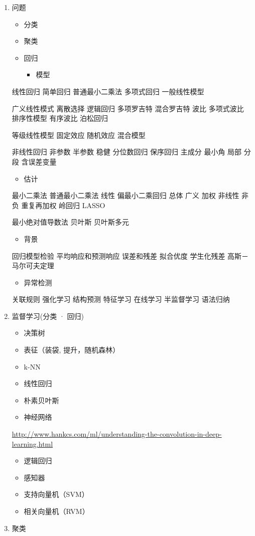 \documentclass[11pt]{article}
\begin{document}
\begin{enumerate}
\item 问题
\label{sec:orgheadline102}
\begin{itemize}
\item 分类
\item 聚类
\item 回归
\begin{itemize}
\item 模型
\end{itemize}
\end{itemize}
线性回归 简单回归 普通最小二乘法 多项式回归 一般线性模型

广义线性模式 离散选择 逻辑回归 多项罗吉特 混合罗吉特 波比 多项式波比 排序性模型 有序波比 泊松回归

等级线性模型 固定效应 随机效应 混合模型

非线性回归 非参数 半参数 稳健 分位数回归 保序回归 主成分 最小角 局部 分段
含误差变量

\begin{itemize}
\item 估计
\end{itemize}

最小二乘法 普通最小二乘法 线性 偏最小二乘回归 总体 广义 加权 非线性 非负 重复再加权 岭回归 LASSO

最小绝对值导数法 贝叶斯 贝叶斯多元
\begin{itemize}
\item 背景
\end{itemize}
回归模型检验 平均响应和预测响应 误差和残差 拟合优度 学生化残差 高斯－马尔可夫定理
\begin{itemize}
\item 异常检测
\end{itemize}
关联规则 强化学习 结构预测 特征学习 在线学习 半监督学习 语法归纳
\item 监督学习(分类 · 回归)
\label{sec:orgheadline103}
\begin{itemize}
\item 决策树
\item 表征（装袋, 提升，随机森林）
\item k-NN
\item 线性回归
\item 朴素贝叶斯
\item 神经网络
\end{itemize}
\url{http://www.hankcs.com/ml/understanding-the-convolution-in-deep-learning.html}
\begin{itemize}
\item 逻辑回归
\item 感知器
\item 支持向量机（SVM）
\item 相关向量机（RVM）
\end{itemize}
\item 聚类
\label{sec:orgheadline104}


\end{enumerate}
\end{document}
